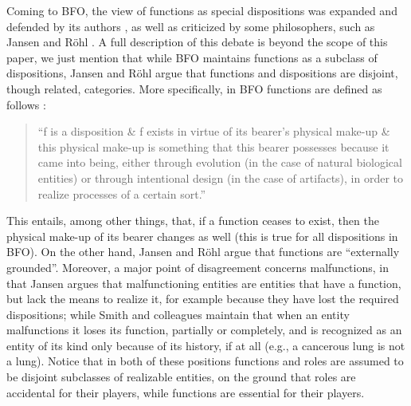 \documentclass[sw]{iosart2x}
\newcommand{\BFO}{\textsc{BFO}\xspace}
\newcommand{\qquotes}[1]{``#1''}
\newcommand{\TODO}[1]{{%
}}
\newcommand{\myComment}[1]{{\unskip \ignorespaces}}
\begin{document}
Coming to \BFO, the view of functions as special dispositions was expanded and defended by its authors \cite{arpFunctionRoleDisposition2008,spearFunctionsBasicFormal2016}, as well as criticized by some philosophers, such as Jansen and Röhl \cite{rohlWhyFunctionsAre2014,jansenFunctionsMalfunctioningNegative2018}. 
A full description of this debate is beyond the scope of this paper, we just mention that while \BFO maintains functions as a subclass of dispositions, Jansen and Röhl argue that functions and dispositions are disjoint, though related, categories. 
More specifically, in \BFO functions are defined as follows \cite{spearFunctionsBasicFormal2016}:
\begin{quote}
  \qquotes{f is a disposition \& f exists in virtue of its bearer’s physical make-up \& this physical make-up is something that this bearer possesses because it came into being, either through evolution (in the case of natural biological entities) or through intentional design (in the case of artifacts), in order to realize processes of a certain sort.}
\end{quote} 
This entails, among other things, that, if a function ceases to exist, then the physical make-up of its bearer changes as well (this is true for all dispositions in \BFO).
On the other hand, Jansen and Röhl argue that functions are \qquotes{externally grounded}.
Moreover, a major point of disagreement concerns malfunctions, in that Jansen argues that malfunctioning entities are entities that have a function, but lack the means to realize it, for example because they have lost the required dispositions; while Smith and colleagues maintain that when an entity malfunctions it loses its function, partially or completely, and is recognized as an entity of its kind only because of its history, if at all (e.g., a cancerous lung is not a lung).
Notice that in both of these positions functions and roles are assumed to be disjoint subclasses of realizable entities, on the ground that roles are \myComment{coincidental} accidental for their players, while functions are essential for their players.

\end{document}
